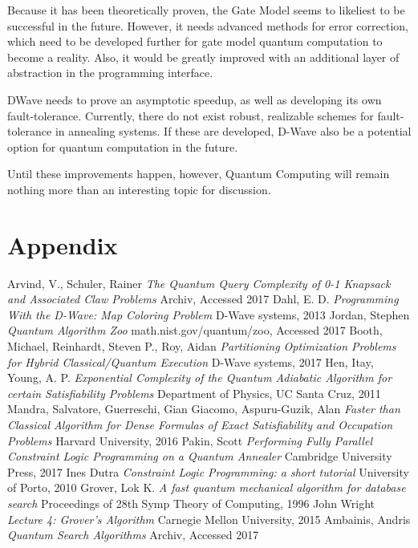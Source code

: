 \documentclass{article}
\begin{document}
Because it has been theoretically proven, the Gate Model seems to likeliest to be successful in the future.
However, it needs advanced methods for error correction, which need to be developed further for gate model quantum computation to become a reality.
Also, it would be greatly improved with an additional layer of abstraction in the programming interface. 

DWave needs to prove an asymptotic speedup, as well as developing its own fault-tolerance.
Currently, there do not exist robust, realizable schemes for fault-tolerance in annealing systems.
If these are developed, D-Wave also be a potential option for quantum computation in the future.

Until these improvements happen, however, Quantum Computing will remain nothing more than an interesting topic for discussion.

\section{Appendix}

\begin{thebibliography}{11}
        Arvind, V., Schuler, Rainer
        \textit{The Quantum Query Complexity of 0-1 Knapsack and Associated Claw Problems}
        Archiv, Accessed 2017
        Dahl, E. D.
        \textit{Programming With the D-Wave: Map Coloring Problem}
        D-Wave systems, 2013
        Jordan, Stephen
        \textit{Quantum Algorithm Zoo}
        math.nist.gov/quantum/zoo, Accessed 2017
        Booth, Michael, Reinhardt, Steven P., Roy, Aidan
        \textit{Partitioning Optimization Problems for Hybrid Classical/Quantum Execution}
        D-Wave systems, 2017
        Hen, Itay, Young, A. P.
        \textit{Exponential Complexity of the Quantum Adiabatic Algorithm for certain Satisfiability Problems}
        Department of Physics, UC Santa Cruz, 2011
        Mandra, Salvatore, Guerreschi, Gian Giacomo, Aspuru-Guzik, Alan
        \textit{Faster than Classical Algorithm for Dense Formulas of Exact Satisfiability and Occupation Problems}
        Harvard University, 2016
        Pakin, Scott
        \textit{Performing Fully Parallel Constraint Logic Programming on a Quantum Annealer}
        Cambridge University Press, 2017
        Ines Dutra
        \textit{Constraint Logic Programming: a short tutorial}
        University of Porto, 2010
        Grover, Lok K.
        \textit{A fast quantum mechanical algorithm for database search}
        Proceedings of 28th Symp Theory of Computing, 1996
        John Wright
        \textit{Lecture 4: Grover's Algorithm}
        Carnegie Mellon University, 2015
        Ambainis, Andris
        \textit{Quantum Search Algorithms}
        Archiv, Accessed 2017
\end{thebibliography}
\end{document}
